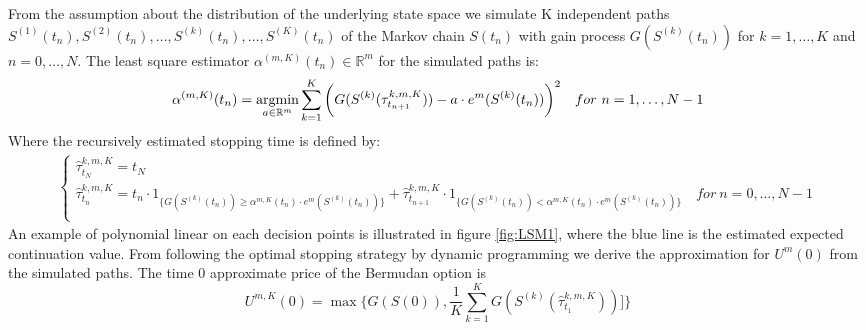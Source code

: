 From the assumption about the distribution of the underlying state space we simulate K independent paths $S^{(1)}(t_n), S^{(2)}(t_n), \ldots, S^{(k)}(t_n), \ldots, S^{(K)}(t_n)$ of the Markov chain $S(t_n)$ with gain process $G(S^{(k)}(t_n))$ for $k=1, \ldots, K$ and $n=0,\ldots,N$. The least square estimator $\alpha^{(m,K)}(t_n)\in \mathbb{R}^m$ for the simulated paths is:
\begin{equation}\label{LSMestimator}
\alpha^{(m,K)}(t_n)= \operatorname*{argmin}_{a\in \mathbb{R}^m} \sum_{k=1}^{K} \bigg(G(S^{(k)}(\tau^{k,m,K}_{t_{n+1}}))  -a \cdot e^m(S^{(k)}(t_{n})) \bigg)^2 \quad for \ n=1, \ldots, N-1
\end{equation}
Where the recursively estimated stopping time is defined by:
\begin{equation}\label{LSMDynamic3}
\begin{split}
\begin{cases}
          \hat{\tau}_{t_N}^{k,m,K} = t_N\\
          \hat{\tau}_{t_n}^{k,m,K} = t_n \cdot 1_{\{G(S^{(k)}(t_n)) \geq \alpha^{m,K}(t_{n}) \cdot e^m(S^{(k)}(t_{n})) \}} + \hat{\tau}_{t_{n+1}}^{k,m,K} \cdot 1_{\{G(S^{(k)}(t_n)) < \alpha^{m,K}(t_{n}) \cdot e^m(S^{(k)}(t_{n})) \}} \quad for \ n={0,\ldots,N-1} \\ 
\end{cases}
\end{split}
\end{equation}
An example of polynomial linear on each decision points is illustrated in figure \ref{fig:LSM1}, where the blue line is the estimated expected continuation value. From following the optimal stopping strategy by dynamic programming we derive the approximation for $U^{m}(0)$ from the simulated paths. The time 0 approximate price of the Bermudan option is
\begin{equation}
U^{m,K}(0) = \max \{ G(S(0)), \frac{1}{K} \sum_{k=1}^{K} G(S^{(k)}(\hat{\tau}^{k,m,K}_{t_1}))]\}
\end{equation}


